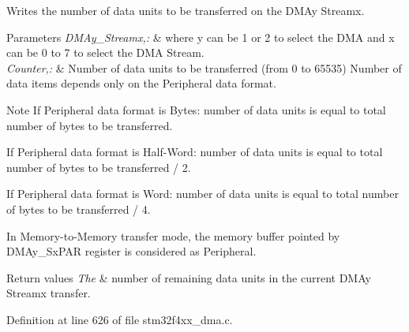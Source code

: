 Writes the number of data units to be transferred on the D\-M\-Ay Streamx. 


\begin{DoxyParams}{Parameters}
{\em D\-M\-Ay\-\_\-\-Streamx,\-:} & where y can be 1 or 2 to select the D\-M\-A and x can be 0 to 7 to select the D\-M\-A Stream. \\
\hline
{\em Counter,\-:} & Number of data units to be transferred (from 0 to 65535) Number of data items depends only on the Peripheral data format.\\
\hline
\end{DoxyParams}
\begin{DoxyNote}{Note}
If Peripheral data format is Bytes\-: number of data units is equal to total number of bytes to be transferred.

If Peripheral data format is Half-\/\-Word\-: number of data units is equal to total number of bytes to be transferred / 2.

If Peripheral data format is Word\-: number of data units is equal to total number of bytes to be transferred / 4.

In Memory-\/to-\/\-Memory transfer mode, the memory buffer pointed by D\-M\-Ay\-\_\-\-Sx\-P\-A\-R register is considered as Peripheral.
\end{DoxyNote}

\begin{DoxyRetVals}{Return values}
{\em The} & number of remaining data units in the current D\-M\-Ay Streamx transfer. \\
\hline
\end{DoxyRetVals}


Definition at line 626 of file stm32f4xx\-\_\-dma.\-c.

